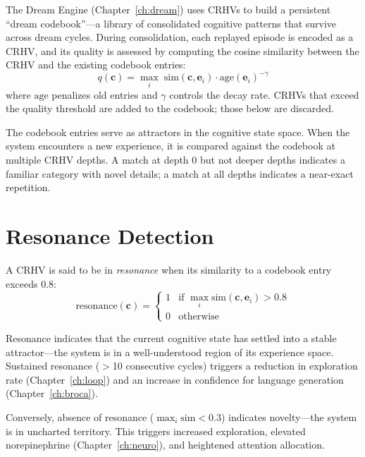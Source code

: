 \documentclass[12pt]{book}
\begin{document}
The Dream Engine (Chapter~\ref{ch:dream}) uses CRHVs to build a persistent ``dream codebook''---a library of consolidated cognitive patterns that survive across dream cycles. During consolidation, each replayed episode is encoded as a CRHV, and its quality is assessed by computing the cosine similarity between the CRHV and the existing codebook entries:
\begin{equation}
q(\mathbf{c}) = \max_{i} \; \text{sim}(\mathbf{c}, \mathbf{e}_i) \cdot \text{age}(\mathbf{e}_i)^{-\gamma}
\end{equation}
where $\text{age}$ penalizes old entries and $\gamma$ controls the decay rate. CRHVs that exceed the quality threshold are added to the codebook; those below are discarded.

The codebook entries serve as attractors in the cognitive state space. When the system encounters a new experience, it is compared against the codebook at multiple CRHV depths. A match at depth 0 but not deeper depths indicates a familiar category with novel details; a match at all depths indicates a near-exact repetition.

\section{Resonance Detection}

A CRHV is said to be in \textit{resonance} when its similarity to a codebook entry exceeds 0.8:
\begin{equation}
\text{resonance}(\mathbf{c}) = \begin{cases} 1 & \text{if } \max_i \text{sim}(\mathbf{c}, \mathbf{e}_i) > 0.8 \\ 0 & \text{otherwise} \end{cases}
\end{equation}

Resonance indicates that the current cognitive state has settled into a stable attractor---the system is in a well-understood region of its experience space. Sustained resonance ($>$10 consecutive cycles) triggers a reduction in exploration rate (Chapter~\ref{ch:loop}) and an increase in confidence for language generation (Chapter~\ref{ch:broca}).

Conversely, absence of resonance ($\max_i \text{sim} < 0.3$) indicates novelty---the system is in uncharted territory. This triggers increased exploration, elevated norepinephrine (Chapter~\ref{ch:neuro}), and heightened attention allocation.
\end{document}
